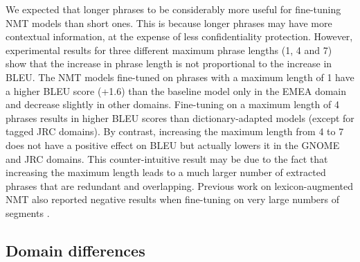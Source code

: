 We expected that longer phrases to be considerably more useful for fine-tuning NMT models than short ones. This is because longer phrases may have more contextual information, at the expense of less confidentiality protection. 
However, experimental results for three different maximum phrase lengths (1, 4 and 7) show that the increase in phrase length is not proportional to the increase in BLEU.
The NMT models fine-tuned on phrases with a maximum length of 1 have a higher BLEU score (+1.6) than the baseline model only in the EMEA domain and decrease slightly in other domains. Fine-tuning on a maximum length of 4 phrases results in higher BLEU scores than dictionary-adapted models (except for tagged JRC domains). By contrast, increasing the maximum length from 4 to 7 does not have a positive effect on BLEU but actually lowers it in the GNOME and JRC domains. This counter-intuitive result may be due to the fact that increasing the maximum length leads to a much larger number of extracted phrases that are redundant and overlapping. Previous work on lexicon-augmented NMT also reported negative results when fine-tuning on very large numbers of segments \parencite{thompson-etal-2019-hablex}.

\subsection{Domain differences}~\label{section:domain_defference}%

